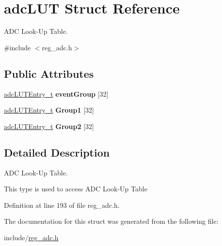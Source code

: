 \hypertarget{structadcLUT}{}\section{adc\+L\+UT Struct Reference}
\label{structadcLUT}


A\+DC Look-\/\+Up Table.  




{\ttfamily \#include $<$reg\+\_\+adc.\+h$>$}

\subsection*{Public Attributes}
\begin{DoxyCompactItemize}
\item 
\mbox{\label{structadcLUT_a87ef9106488d6a72066ef2042bb6cd5d}} 
\mbox{\hyperlink{reg__adc_8h_a1c42e013424ed4edc03d76d40b801add}{adc\+L\+U\+T\+Entry\+\_\+t}} {\bfseries event\+Group} \mbox{[}32\mbox{]}
\item 
\mbox{\label{structadcLUT_aa6d11f4256c5dc27a0abc478f0686dd8}} 
\mbox{\hyperlink{reg__adc_8h_a1c42e013424ed4edc03d76d40b801add}{adc\+L\+U\+T\+Entry\+\_\+t}} {\bfseries Group1} \mbox{[}32\mbox{]}
\item 
\mbox{\label{structadcLUT_ae7dcdb3e0f0f3a8da504b6460e790df0}} 
\mbox{\hyperlink{reg__adc_8h_a1c42e013424ed4edc03d76d40b801add}{adc\+L\+U\+T\+Entry\+\_\+t}} {\bfseries Group2} \mbox{[}32\mbox{]}
\end{DoxyCompactItemize}


\subsection{Detailed Description}
A\+DC Look-\/\+Up Table. 

This type is used to access A\+DC Look-\/\+Up Table 

Definition at line 193 of file reg\+\_\+adc.\+h.



The documentation for this struct was generated from the following file\+:\begin{DoxyCompactItemize}
\item 
include/\mbox{\hyperlink{reg__adc_8h}{reg\+\_\+adc.\+h}}\end{DoxyCompactItemize}
